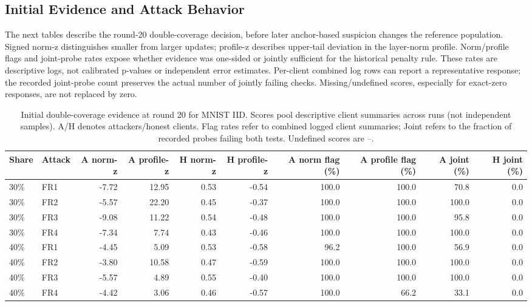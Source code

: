\documentclass[conference]{IEEEtran}
\begin{document}
\subsection{Initial Evidence and Attack Behavior}
The next tables describe the round-20 double-coverage decision, before later anchor-based suspicion changes the reference population. Signed norm-z distinguishes smaller from larger updates; profile-z describes upper-tail deviation in the layer-norm profile. Norm/profile flags and joint-probe rates expose whether evidence was one-sided or jointly sufficient for the historical penalty rule. These rates are descriptive logs, not calibrated p-values or independent error estimates. Per-client combined log rows can report a representative response; the recorded joint-probe count preserves the actual number of jointly failing checks. Missing/undefined scores, especially for exact-zero responses, are not replaced by zero.
\begin{table}[t]\centering\scriptsize
\setlength{\tabcolsep}{3.5pt}
\caption{Initial double-coverage evidence at round 20 for MNIST IID. Scores pool descriptive client summaries across runs (not independent samples). A/H denotes attackers/honest clients. Flag rates refer to combined logged client summaries; Joint refers to the fraction of recorded probes failing both tests. Undefined scores are --.}
\begin{tabular}{llrrrrrrrr}\toprule
Share & Attack & A norm-z & A profile-z & H norm-z & H profile-z & A norm flag (\%) & A profile flag (\%) & A joint (\%) & H joint (\%) \\\midrule
30\% & FR1 & -7.72 & 12.95 & 0.53 & -0.54 & 100.0 & 100.0 & 70.8 & 0.0 \\
30\% & FR2 & -5.57 & 22.20 & 0.45 & -0.37 & 100.0 & 100.0 & 100.0 & 0.0 \\
30\% & FR3 & -9.08 & 11.22 & 0.54 & -0.48 & 100.0 & 100.0 & 95.8 & 0.0 \\
30\% & FR4 & -7.34 & 7.74 & 0.43 & -0.46 & 100.0 & 100.0 & 100.0 & 0.0 \\
40\% & FR1 & -4.45 & 5.09 & 0.53 & -0.58 & 96.2 & 100.0 & 56.9 & 0.0 \\
40\% & FR2 & -3.80 & 10.58 & 0.47 & -0.59 & 100.0 & 100.0 & 100.0 & 0.0 \\
40\% & FR3 & -5.57 & 4.89 & 0.55 & -0.40 & 100.0 & 100.0 & 100.0 & 0.0 \\
40\% & FR4 & -4.42 & 3.06 & 0.46 & -0.57 & 100.0 & 66.2 & 33.1 & 0.0 \\
\bottomrule\end{tabular}\end{table}
\end{document}

